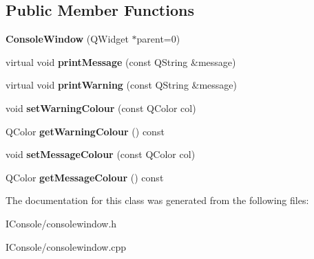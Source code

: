 \subsection*{Public Member Functions}
\begin{DoxyCompactItemize}
\item 
\hypertarget{class_console_window_a18a5ddfb71f2bcec3a4ce8abee0863eb}{{\bfseries Console\-Window} (Q\-Widget $\ast$parent=0)}\label{class_console_window_a18a5ddfb71f2bcec3a4ce8abee0863eb}

\item 
\hypertarget{class_console_window_a92eb7fb004686e2659530d959080846e}{virtual void {\bfseries print\-Message} (const Q\-String \&message)}\label{class_console_window_a92eb7fb004686e2659530d959080846e}

\item 
\hypertarget{class_console_window_ab06d210a320e402b371dfa56d73f0d54}{virtual void {\bfseries print\-Warning} (const Q\-String \&message)}\label{class_console_window_ab06d210a320e402b371dfa56d73f0d54}

\item 
\hypertarget{class_console_window_a18dbd0234d103461b57da2b724ab5b2b}{void {\bfseries set\-Warning\-Colour} (const Q\-Color col)}\label{class_console_window_a18dbd0234d103461b57da2b724ab5b2b}

\item 
\hypertarget{class_console_window_afb123596c8c2e460301721dfe28b2642}{Q\-Color {\bfseries get\-Warning\-Colour} () const }\label{class_console_window_afb123596c8c2e460301721dfe28b2642}

\item 
\hypertarget{class_console_window_a92a66819f11ee2cb7ad6079bb0542562}{void {\bfseries set\-Message\-Colour} (const Q\-Color col)}\label{class_console_window_a92a66819f11ee2cb7ad6079bb0542562}

\item 
\hypertarget{class_console_window_a4deda073bdf749e5198ba48a41fef340}{Q\-Color {\bfseries get\-Message\-Colour} () const }\label{class_console_window_a4deda073bdf749e5198ba48a41fef340}

\end{DoxyCompactItemize}


The documentation for this class was generated from the following files\-:\begin{DoxyCompactItemize}
\item 
I\-Console/consolewindow.\-h\item 
I\-Console/consolewindow.\-cpp\end{DoxyCompactItemize}
